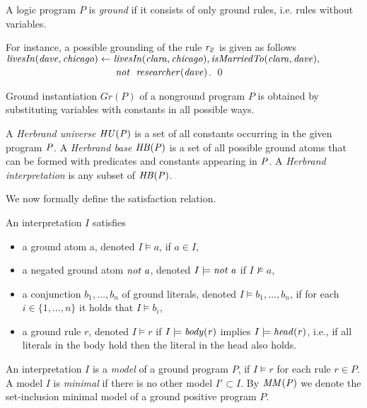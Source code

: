 A logic program $P$ is \emph{ground} if it consists of only ground rules, i.e. rules without
variables. 

\begin{example}
For instance, a possible grounding of the rule $\mathit{r_2}$ is given as follows $\mathit{livesIn(dave,chicago)\leftarrow livesIn(clara,chicago),isMarriedTo(clara,dave),}$\\$
\phantom{livesIn(dave,chicago)\leftarrow}\mathit{not}~ \mathit{\;researcher(dave)}$. \qed
\end{example}

Ground instantiation $Gr(P)$ of a nonground program $P$ is obtained by substituting variables with constants in all possible ways. 


\begin{definition}
A \emph{Herbrand universe}  $\mathit{HU(P)}$ is a set of all constants occurring in the given program $\mathit{P}$. A \emph{Herbrand base}  $\mathit{HB(P)}$ is a set of all possible ground atoms that can be formed with predicates and constants appearing in $\mathit{P}$. A \emph{Herbrand interpretation} is any subset of $\mathit{HB(P)}$.
\end{definition}

We now formally define the satisfaction relation. 

\begin{definition} An interpretation $I$ satisfies
\begin{itemize}
\item a ground atom a, denoted $I \models a$, if $a \in I$,
\item a negated ground atom $\mathit{not\; a}$, denoted $I \models \mathit{not\; a}$ if $I \not \models a$,
\item  a conjunction $b_1,\dotsc,b_n$ of ground literals, denoted $I \models b_1,\dotsc,b_n$, if for
each $i\in \{1,\dotsc, n\}$ it holds that $I \models b_i$,
\item a ground rule $r$, denoted $I \models r$ if $I \models \mathit{body(r)}$ implies $I \models \mathit{head(r)}$, i.e., if all literals in the body hold then the literal in the head also holds.
\end{itemize}
\end{definition}

An interpretation $I$ is a \emph{model} of a ground program $P$, if $I \models r$ for each rule
$r \in P$. A model $I$ is \emph{minimal} if there is no other model $I' \subset I$.
By $\mathit{MM(P)}$ we denote the set-inclusion minimal model of a ground positive program $P$.

